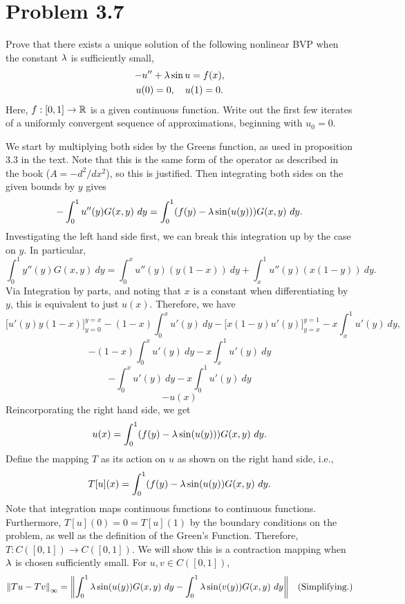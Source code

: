 \section{Problem 3.7}
Prove that there exists a unique solution of the following nonlinear BVP when the constant $\mathrm{\lambda}$ is sufficiently small, 
\begin{gather*}
    -u'' + \mathrm{\lambda} \sin u = f(x),\\
    u(0) = 0, \quad u(1) = 0.
\end{gather*}
Here, $f: [0, 1] \rightarrow \mathbb{R}$ is a given continuous function. Write out the first few iterates of a uniformly convergent sequence of approximations, beginning with $u_0 = 0$.
\partbreak
\begin{solution}

    We start by multiplying both sides by the Greens function, as used in proposition 3.3 in the text. Note that this is the same form of the operator as described in the book ($A = -d^2 /dx^2 $), so this is justified. Then integrating both sides on the given bounds by $y$ gives
    \[-\int_0^1u''(y)G(x, y) \ dy = \int_0^1 (f(y) - \mathrm{\lambda} \sin(u(y))) G(x, y) \ dy.\]
    Investigating the left hand side first, we can break this integration up by the case on $y$. In particular,
    \[\int_0^1 y''(y)G(x, y) \ dy = \int_0^x u''(y)(y(1 - x)) \ dy + \int_x^1 u''(y)(x(1 - y)) \ dy.\]
    Via Integration by parts, and noting that $x$ is a constant when differentiating by $y$, this is equivalent to just $u(x)$. Therefore, we have 
    \[\Big[ u'(y)y(1 - x)\Big]_{y = 0}^{y = x} - (1 - x)\int_0^x u'(y) \ dy - \Big[ x(1 - y)u'(y)\Big]_{y = x}^{y = 1} - x\int_x^1 u'(y) \ dy,\]
    \[-(1 - x)\int_0^x u'(y) \ dy - x\int_x^1 u'(y) \ dy\]
    \[ -\int_0^x u'(y) \ dy - x\int_0^1 u'(y) \ dy\]
    \[-u(x)\]
    Reincorporating the right hand side, we get
    \[u(x) = \int_0^1 (f(y) - \lm \sin(u(y))) G(x, y) \ dy.\]
    Define the mapping $T$ as its action on $u$ as shown on the right hand side, i.e.,
    \[T[u](x) = \int_0^1 (f(y) - \mathrm{\lambda} \sin(u(y)) G(x, y) \ dy.\]
    Note that integration maps continuous functions to continuous functions. Furthermore, $T[u](0) = 0 = T[u](1)$ by the boundary conditions on the problem, as well as the definition of the Green's Function. Therefore, $T: C([0, 1]) \rightarrow C([0, 1])$. We will show this is a contraction mapping when $\mathrm{\lambda}$ is chosen sufficiently small. For $u, v \in C([0, 1])$,
    \tightalignbreak
    \begin{align*}
        \norm{Tu - Tv}_\infty &= \norm{\int_0^1 \lm \sin(u(y)) G(x, y) \ dy - \int_0^1 \lm \sin(v(y)) G(x, y) \ dy} &\text{(Simplifying.)}\\

\end{align*}
\end{solution}
